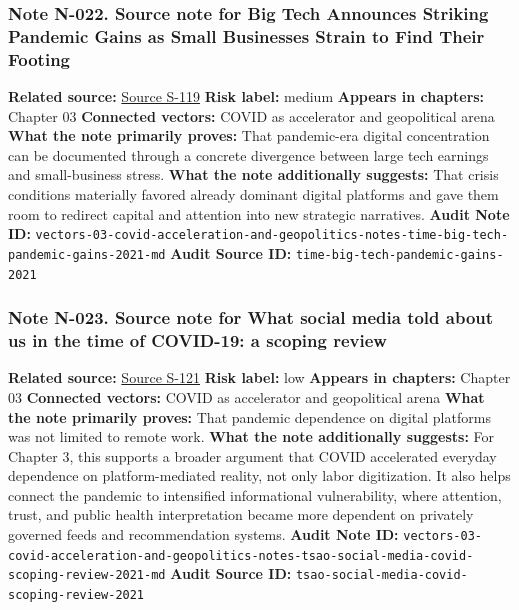 \documentclass[
  american,
  11pt,
  letterpaper,
]{article}
\begin{document}
\subsubsection{Note N-022. Source note for Big Tech Announces Striking
Pandemic Gains as Small Businesses Strain to Find Their
Footing}\label{note-n-022-vectors-03-covid-acceleration-and-geopolitics-notes-time-big-tech-pandemic-gains-2021-md}

\textbf{Related source:}
\hyperref[source-s-119-big-tech-announces-striking-pandemic-gains-as-small-businesses-strain-to-find-their-footing]{Source
S-119} \textbf{Risk label:} medium \textbf{Appears in chapters:} Chapter
03 \textbf{Connected vectors:} COVID as accelerator and geopolitical
arena \textbf{What the note primarily proves:} That pandemic-era digital
concentration can be documented through a concrete divergence between
large tech earnings and small-business stress. \textbf{What the note
additionally suggests:} That crisis conditions materially favored
already dominant digital platforms and gave them room to redirect
capital and attention into new strategic narratives. \textbf{Audit Note
ID:}
\texttt{vectors-03-covid-acceleration-and-geopolitics-notes-time-big-tech-pandemic-gains-2021-md}
\textbf{Audit Source ID:} \texttt{time-big-tech-pandemic-gains-2021}

\subsubsection{Note N-023. Source note for What social media told about
us in the time of COVID-19: a scoping
review}\label{note-n-023-vectors-03-covid-acceleration-and-geopolitics-notes-tsao-social-media-covid-scoping-review-2021-md}

\textbf{Related source:}
\hyperref[source-s-121-what-social-media-told-about-us-in-the-time-of-covid-19-a-scoping-review]{Source
S-121} \textbf{Risk label:} low \textbf{Appears in chapters:} Chapter 03
\textbf{Connected vectors:} COVID as accelerator and geopolitical arena
\textbf{What the note primarily proves:} That pandemic dependence on
digital platforms was not limited to remote work. \textbf{What the note
additionally suggests:} For Chapter 3, this supports a broader argument
that COVID accelerated everyday dependence on platform-mediated reality,
not only labor digitization. It also helps connect the pandemic to
intensified informational vulnerability, where attention, trust, and
public health interpretation became more dependent on privately governed
feeds and recommendation systems. \textbf{Audit Note ID:}
\texttt{vectors-03-covid-acceleration-and-geopolitics-notes-tsao-social-media-covid-scoping-review-2021-md}
\textbf{Audit Source ID:}
\texttt{tsao-social-media-covid-scoping-review-2021}
\end{document}
